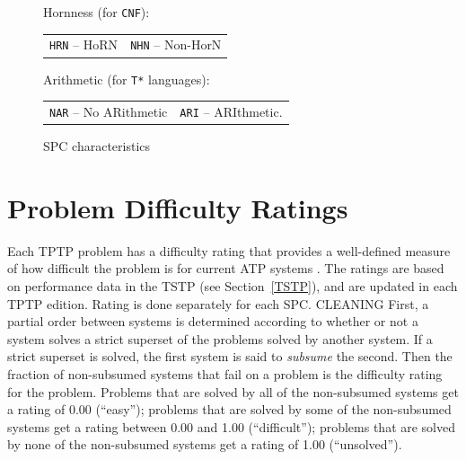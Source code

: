 \documentclass{easychair}
\newenvironment{packed_itemize}{
\vspace*{-0.2em}
\begin{itemize}
\setlength{\partopsep}{0pt}
\setlength{\itemsep}{1pt}
\setlength{\parskip}{0pt}
\setlength{\parsep}{0pt}
}{\end{itemize}}
\begin{document}
\begin{figure}[bht]
\begin{packed_itemize}
\item Hornness (for {\tt CNF}): \\
      \begin{tabular}{@{}p{5cm}l}
      {\tt HRN} -- HoRN &
      {\tt NHN} -- Non-HorN
      \end{tabular}
\item Arithmetic (for {\tt T*} languages): \\
      \begin{tabular}{@{}p{5cm}l}
      {\tt NAR} -- No ARithmetic &
      {\tt ARI} -- ARIthmetic.
      \end{tabular}
\end{packed_itemize}
\caption{SPC characteristics}
\label{SPCCharacteristics}
\end{figure} 

\section{Problem Difficulty Ratings}
\label{Ratings}

Each TPTP problem has a difficulty rating that provides a well-defined measure of how difficult 
the problem is for current ATP systems \cite{SS01}.
The ratings are based on performance data in the TSTP (see Section~\ref{TSTP}), and are updated
in each TPTP edition.
Rating is done separately for each SPC.
CLEANING
First, a partial order between systems is determined according to whether or not a system 
solves a strict superset of the problems solved by another system. 
If a strict superset is solved, the first system is said to {\em subsume} the second. 
Then the fraction of non-subsumed systems that fail on a problem is the difficulty rating 
for the problem. 
Problems that are solved by all of the non-subsumed systems get a rating of 0.00 (``easy'');
problems that are solved by some of the non-subsumed systems get a rating between 
0.00 and 1.00 (``difficult''); 
problems that are solved by none of the non-subsumed systems get a rating of 1.00 (``unsolved'').
\end{document}
